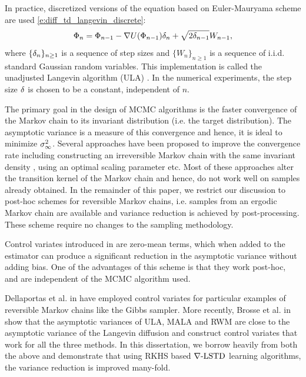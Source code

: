 In practice, discretized versions of the equation based on Euler-Mauryama scheme are used \eqref{e:diff_td_langevin_discrete}:
\begin{equation*}
\Phi_n = \Phi_{n-1} - \nabla U(\Phi_{n-1}) \delta_{n} + \sqrt{2  \delta_{n-1}} W_{n-1} ,
\end{equation*}
where $\{\delta_n\}_{n\geq 1}$ is a sequence of step sizes and $\{W_n\}_{n\geq 1}$ is a sequence of i.i.d. standard Gaussian random variables. This implementation is called the unadjusted Langevin algorithm (ULA) \cite{andddefdoujor03}. In the numerical experiments, the step size $\delta$ is chosen to be a constant, independent of $n$. 

The primary goal in the design of MCMC algorithms is the faster convergence of the Markov chain to its invariant distribution (i.e. the target distribution). The asymptotic variance is a measure of this convergence and hence, it is ideal to minimize $\sigma_\infty^2$. Several approaches have been proposed to improve the convergence rate including constructing an irreversible Markov chain with the same invariant density \cite{hwanorwu15, dunlelpav16}, using an optimal scaling parameter \cite{robros01} etc. Most of these approaches alter the transition kernel of the Markov chain and hence, do not work well on samples already obtained. In the remainder of this paper, we restrict our discussion to post-hoc schemes for reversible Markov chains, i.e. samples from an ergodic Markov chain are available and variance reduction is achieved by post-processing. These scheme require no changes to the sampling methodology. 

Control variates introduced in \cite{HenThesis,henmeytad03a,kimhen07,ctcn} are zero-mean terms, which when added to the estimator can produce a significant reduction in the asymptotic variance without adding bias. One of the advantages of this scheme is that they work post-hoc, and are independent of the MCMC algorithm used. 

Dellaportas et al. in \cite{delkon12} have employed control variates for particular examples of reversible Markov chains like the Gibbs sampler.
More recently, Brosse et al. in \cite{brodurmeymou18} show that the asymptotic variances of ULA, MALA and RWM are close to the asymptotic variance of the Langevin diffusion and construct control variates that work for all the three methods. In this dissertation, we borrow heavily from both the above and demonstrate that using RKHS based $\nabla\text{-LSTD}$ learning algorithms, the variance reduction is improved many-fold. 

